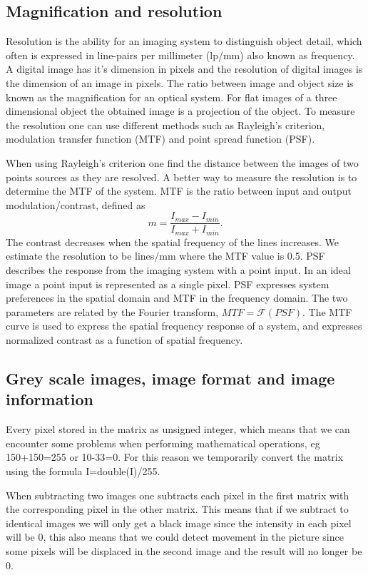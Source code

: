 \subsection{Magnification and resolution}
Resolution is the ability for an imaging system to distinguish object detail, which often is expressed in line-pairs per millimeter (lp/mm) also known as frequency. %
A digital image has it's dimension in pixels and the resolution of digital images is the dimension of an image in pixels. The ratio between image and object size is known as the magnification for an optical system. For flat images of a three dimensional object the obtained image is a projection of the object. To measure the resolution one can use different methods such as Rayleigh's criterion, modulation transfer function (MTF) and point spread function (PSF). 

When using Rayleigh's criterion one find the distance between the images of two points sources as they are resolved. A better way to measure the resolution is to determine the MTF of the system. MTF is the ratio between input and output modulation/contrast, defined as \[ m = \frac{I_{max}-I_{min}}{I_{max}+I_{min}}. \] The contrast decreases when the spatial frequency of the lines increases. We estimate the resolution to be lines/mm where the MTF value is 0.5. %
PSF describes the response from the imaging system with a point input. In an ideal image a point input is represented as a single pixel. PSF expresses system preferences in the spatial domain and MTF in the frequency domain. The two parameters are related by the Fourier transform, $ MTF = \mathcal{F}(PSF) $. The MTF curve is used to express the spatial frequency response of a system, and expresses normalized contrast as a function of spatial frequency. %

\subsection{Grey scale images, image format and image information}
Every pixel stored in the matrix as unsigned integer, which means that we can encounter some problems when performing mathematical operations, eg 150+150=255 or 10-33=0. For this reason we temporarily convert the matrix using the formula I=double(I)/255. 

When subtracting two images one subtracts each pixel in the first matrix with the corresponding pixel in the other matrix. %
This means that if we subtract to identical images we will only get a black image since the intensity in each pixel will be 0, this also means that we could detect movement in the picture since some pixels will be displaced in the second image and the result will no longer be 0.

